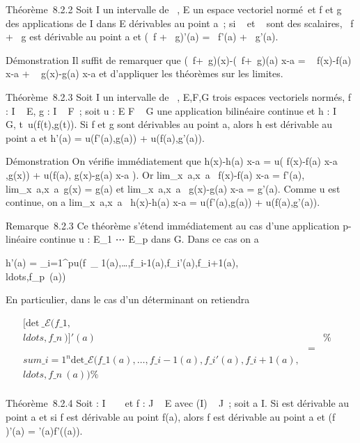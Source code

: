 \documentclass[]{article}
\begin{document}
Théorème~8.2.2 Soit I un intervalle de ~, E un espace vectoriel normé~et
f et g des applications de I dans E dérivables au point a~; si \alpha~ et \beta~
sont des scalaires, \alpha~f + \beta~g est dérivable au point a et (\alpha~f + \beta~g)'(a) =
\alpha~f'(a) + \beta~g'(a).

Démonstration Il suffit de remarquer que  (\alpha~f+\beta~g)(x)-(\alpha~f+\beta~g)(a)
\over x-a = \alpha~ f(x)-f(a) \over x-a +
\beta~ g(x)-g(a) \over x-a et d'appliquer les théorèmes
sur les limites.

Théorème~8.2.3 Soit I un intervalle de ~, E,F,G trois espaces vectoriels
normés, f : I \rightarrow~ E, g : I \rightarrow~ F~; soit u : E \times F \rightarrow~ G une application
bilinéaire continue et h : I \rightarrow~ G,
t\mapsto~u(f(t),g(t)). Si f et g sont dérivables au
point a, alors h est dérivable au point a et h'(a) = u(f'(a),g(a)) +
u(f(a),g'(a)).

Démonstration On vérifie immédiatement que  h(x)-h(a)
\over x-a = u( f(x)-f(a) \over x-a
,g(x)) + u(f(a), g(x)-g(a) \over x-a ). Or
lim\_x\rightarrow~a,x\neq~a~
f(x)-f(a) \over x-a = f'(a),
lim\_x\rightarrow~a,x\neq~a~g(x)
= g(a) et
lim\_x\rightarrow~a,x\neq~a~
g(x)-g(a) \over x-a = g'(a). Comme u est continue, on a
lim\_x\rightarrow~a,x\neq~a~
h(x)-h(a) \over x-a = u(f'(a),g(a)) + u(f(a),g'(a)).

Remarque~8.2.3 Ce théorème s'étend immédiatement au cas d'une
application p-linéaire continue u : E\_1
\times⋯ \times E\_p dans G. Dans ce cas on a

h'(a) = \sum \_i=1^pu(f~\_
1(a),\ldots,f\_i-1(a),f\_i'(a),f\_i+1(a),\\ldots,f\_p~(a))

En particulier, dans le cas d'un déterminant on retiendra

\begin{align*}
{[}\mathrm{det}~
\_\mathcal{E}(f\_1,\\ldots,f\_n~){]}'(a)&&
\%& \\ & =& \\sum
\_i=1^n \mathrm{det} \_
\mathcal{E}(f\_1(a),\ldots,f\_i-1(a),f\_i'(a),f\_i+1(a),\\ldots,f\_n~(a))\%&
\\ \end{align*}

Théorème~8.2.4 Soit \phi : I \rightarrow~ ~ et f : J \rightarrow~ E avec \phi(I) \subset~ J~; soit a \in I.
Si \phi est dérivable au point a et si f est dérivable au point f(a), alors
f \cdot \phi est dérivable au point a et (f \cdot \phi)'(a) = \phi'(a)f'(\phi(a)).
\end{document}
